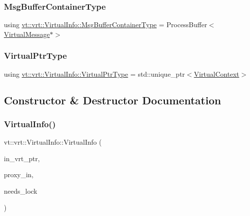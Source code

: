 \subsubsection{\texorpdfstring{Msg\+Buffer\+Container\+Type}{MsgBufferContainerType}}
{\footnotesize\ttfamily using \hyperlink{structvt_1_1vrt_1_1_virtual_info_a0f7b9bd9d5ae38c1e9df13e946b21814}{vt\+::vrt\+::\+Virtual\+Info\+::\+Msg\+Buffer\+Container\+Type} =  Process\+Buffer$<$\hyperlink{structvt_1_1vrt_1_1_virtual_message}{Virtual\+Message}$\ast$$>$}

\mbox{\label{structvt_1_1vrt_1_1_virtual_info_aede28e76785423dd2685fe4cf54afa21}} 
\subsubsection{\texorpdfstring{Virtual\+Ptr\+Type}{VirtualPtrType}}
{\footnotesize\ttfamily using \hyperlink{structvt_1_1vrt_1_1_virtual_info_aede28e76785423dd2685fe4cf54afa21}{vt\+::vrt\+::\+Virtual\+Info\+::\+Virtual\+Ptr\+Type} =  std\+::unique\+\_\+ptr$<$\hyperlink{structvt_1_1vrt_1_1_virtual_context}{Virtual\+Context}$>$}



\subsection{Constructor \& Destructor Documentation}
\mbox{\label{structvt_1_1vrt_1_1_virtual_info_a8c6544976bd8778afc357ee3e14b0e07}} 
\subsubsection{\texorpdfstring{Virtual\+Info()}{VirtualInfo()}\hspace{0.1cm}{\footnotesize\ttfamily [1/2]}}
{\footnotesize\ttfamily vt\+::vrt\+::\+Virtual\+Info\+::\+Virtual\+Info (\begin{DoxyParamCaption}\item[{\hyperlink{structvt_1_1vrt_1_1_virtual_info_aede28e76785423dd2685fe4cf54afa21}{Virtual\+Ptr\+Type}}]{in\+\_\+vrt\+\_\+ptr,  }\item[{\hyperlink{namespacevt_a1b417dd5d684f045bb58a0ede70045ac}{Virtual\+Proxy\+Type} const \&}]{proxy\+\_\+in,  }\item[{bool}]{needs\+\_\+lock }\end{DoxyParamCaption})}

